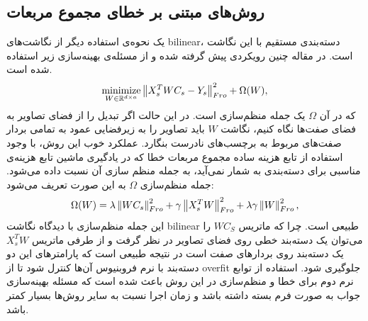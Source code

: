 \subsection{روش‌های مبتنی بر خطای مجموع مربعات} \label{mse_loss_methods}

یک نحوه‌ی استفاده دیگر از نگاشت‌های \gls{bilinear}، دسته‌بندی مستقیم با این نگاشت است.
در مقاله \cite{emb15} چنین رویکردی پیش گرفته شده و از مسئله‌ی بهینه‌سازی زیر استفاده شده است.
\begin{equation}
\operatorname*{minimize}_{W \in \mathbb{R}^{d \times a}} \left \lVert X_s^T WC_s - Y_s \right \rVert_{Fro}^2 + \Omega(W) \label{eq:emb},
\end{equation}
که در آن $\Omega$ یک جمله منظم‌سازی است.
در این حالت اگر تبدیل را از فضای تصاویر به فضای صفت‌ها نگاه کنیم، نگاشت $W$ باید تصاویر را به زیرفضایی عمود به تمامی بردار صفت‌های مربوط به برچسب‌های نادرست بنگارد.
عملکرد خوب این روش، با وجود استفاده از تابع هزینه ساده مجموع مربعات خطا که در یادگیری ماشین تابع هزینه‌ی مناسبی برای دسته‌بندی به شمار نمی‌آید، به جمله منظم سازی آن نسبت داده می‌شود. جمله منظم‌سازی $\Omega$ به این صورت تعریف می‌شود:
\begin{equation} \label{eq:emb_reg}
\Omega(W) = \lambda \left \lVert WC_s \right \rVert_{Fro}^2 + \gamma \left \lVert X_s^T W \right \rVert_{Fro}^2  + \lambda \gamma \left \lVert W \right \rVert_{Fro}^2,
\end{equation}
این جمله منظم‌سازی با دیدگاه نگاشت \gls{bilinear} طبیعی است. چرا که ماتریس $WC_S$ را می‌توان یک دسته‌بند خطی روی فضای تصاویر در نظر گرفت و از طرفی ماتریس $X_s^T W$ یک دسته‌بند روی بردارهای صفت است در نتیجه طبیعی است که پارامترهای این دو دسته‌بند با نرم فروبنیوس آن‌ها کنترل شود تا از \gls{overfit}
 جلوگیری شود.
استفاده از توابع نرم دوم برای خطا و منظم‌سازی در این روش باعث شده است که مسئله بهینه‌سازی جواب به صورت فرم بسته داشته باشد و زمان اجرا نسبت به سایر روش‌ها بسیار کمتر باشد.

